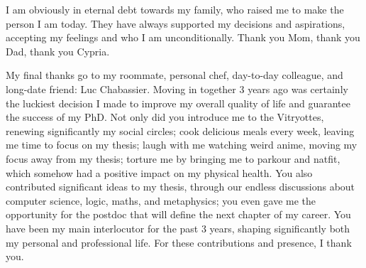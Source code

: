 I am obviously in eternal debt towards my family, who raised me to make the person I am today. They have always supported my decisions and aspirations, accepting my feelings and who I am unconditionally. Thank you Mom, thank you Dad, thank you Cypria.

My final thanks go to my roommate, personal chef, day-to-day colleague, and long-date friend: Luc Chabassier. Moving in together 3 years ago was certainly the luckiest decision I made to improve my overall quality of life and guarantee the success of my PhD. Not only did you introduce me to the Vitryottes, renewing significantly my social circles; cook delicious meals every week, leaving me time to focus on my thesis; laugh with me watching weird anime, moving my focus away from my thesis; torture me by bringing me to parkour and natfit, which somehow had a positive impact on my physical health. You also contributed significant ideas to my thesis, through our endless discussions about computer science, logic, maths, and metaphysics; you even gave me the opportunity for the postdoc that will define the next chapter of my career. You have been my main interlocutor for the past 3 years, shaping significantly both my personal and professional life. For these contributions and presence, I thank you.